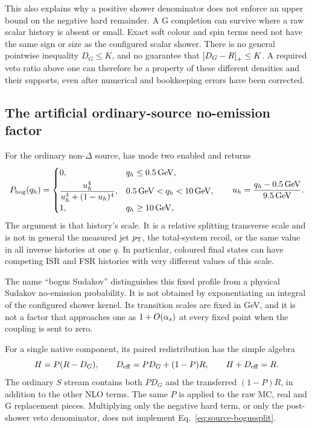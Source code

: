 This also explains why a positive shower denominator does not enforce an
upper bound on the negative hard remainder. A G completion can survive
where a raw scalar history is absent or small. Exact soft colour and spin
terms need not have the same sign or size as the configured scalar shower.
There is no general pointwise inequality $D_G\leq K$, and no guarantee that
$\left[D_G-R\right]_+\leq K$. A required veto ratio above one can therefore be a
property of these different densities and their supports, even after
numerical and bookkeeping errors have been corrected.

\subsection{The artificial ordinary-source no-emission factor}
\label{sec:source-bogus}

For the ordinary non-$\Delta$ source,
 has mode two enabled and returns
\begin{equation}
 P_{\rm bog}(q_h)=
 \begin{cases}
  0,&q_h\leq0.5\,\mathrm{GeV},\\[1mm]
  \displaystyle\frac{u_h^4}{u_h^4+(1-u_h)^4},
    &0.5\,\mathrm{GeV}<q_h<10\,\mathrm{GeV},\\[2mm]
  1,&q_h\geq10\,\mathrm{GeV},
 \end{cases}
 \qquad u_h=\frac{q_h-0.5\,\mathrm{GeV}}{9.5\,\mathrm{GeV}}.
 \label{eq:source-bogus}
\end{equation}
The argument is that history's  scale. It is a
relative splitting transverse scale and is not in general the measured
jet $p_{\mathrm T}$, the total-system recoil, or the same value in all inverse
histories at one $q$. In particular, coloured final states can have
competing ISR and FSR histories with very different values of this scale.

The name ``bogus Sudakov'' distinguishes this fixed profile from a physical
Sudakov no-emission probability. It is not obtained by exponentiating an
integral of the configured shower kernel. Its transition scales are fixed
in GeV, and it is not a factor that approaches one as
$1+O(\alpha_s)$ at every fixed point when the coupling is sent to zero.

For a single native component, its paired redistribution has the simple
algebra
\begin{equation}
 H=P(R-D_G),\qquad
 D_{\rm eff}=P D_G+(1-P)R,
 \qquad H+D_{\rm eff}=R.
 \label{eq:source-bogussplit}
\end{equation}
The ordinary $S$ stream contains both $P D_G$ and the transferred
$(1-P)R$, in addition to the other NLO terms. The same $P$ is applied to the
raw MC, real and G replacement pieces. Multiplying only the negative hard
term, or only the post-shower veto denominator, does not implement
Eq.~\eqref{eq:source-bogussplit}.

